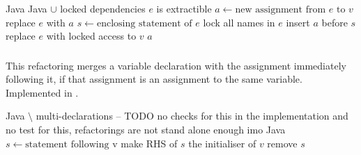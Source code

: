 \begin{algorithm}[p]
\caption{$\refactoring{Extract Assignment}(v : \type{LocalVar}, e : \type{Expr}) : \type{Assignment}$}
\label{alg:ExtractAssignment}
\begin{algorithmic}[1]
\REQUIRE Java
\ENSURE Java $\cup$ locked dependencies
\medskip
\STATE \assert $e$ is extractible
\STATE $a \leftarrow \text{new assignment from $e$ to $v$}$
  \STATE replace $e$ with $a$
\ELSE
  \STATE $s \leftarrow \text{enclosing statement of $e$}$
  \STATE lock all names in $e$
  \STATE insert $a$ before $s$
  \STATE replace $e$ with locked access to $v$
\ENDIF
\RETURN $a$
\end{algorithmic}
\end{algorithm}

\subsubsection{}
This refactoring merges a variable declaration with the assignment immediately following it, if that assignment is an assignment to the same variable. Implemented in .

\begin{algorithm}[p]
\caption{$\refactoring{Merge Variable Declaration}(v : \type{LocalVar})$}
\label{alg:MergeVariableDeclaration}
\begin{algorithmic}[1]
\REQUIRE Java $\setminus$ multi-declarations -- TODO no checks for this in the implementation and no test for this, refactorings are not stand alone enough imo
\ENSURE Java
\medskip
{}
  \RETURN
\ENDIF
\STATE $s \leftarrow \text{statement following v}$
  \STATE make RHS of $s$ the initialiser of $v$
  \STATE remove $s$
\ENDIF
\end{algorithmic}
\end{algorithm}

